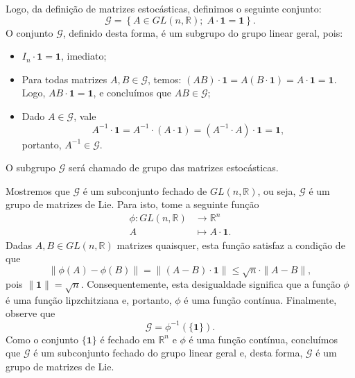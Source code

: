 \documentclass[twoside,openright,titlepage,numbers=noenddot,headinclude,  lineheaders footinclude=true,cleardoublepage=empty,
                                BCOR=5mm,paper=a4,fontsize=12pt ]{scrbook}
\theoremstyle{definition}
\begin{document}
Logo, da definição de matrizes estocásticas, definimos o seguinte conjunto:
\[ \mathcal{G} = \left\{ A \in GL(n, \mathbb{R}); \; A \cdot \mathbf{1} = \mathbf{1} \right\}. \]
O conjunto $\mathcal{G}$, definido desta forma, é um subgrupo do grupo linear geral, pois:
\begin{itemize}
	\item $I_n \cdot \mathbf{1} = \mathbf{1}$, imediato;
	\item Para todas matrizes $A, B \in \mathcal{G}$, temos:
		$(AB)\cdot \mathbf{1} = A(B \cdot\mathbf{1}) = A \cdot \mathbf{1} = \mathbf{1}.$ Logo, $AB \cdot \mathbf{1} = \mathbf{1}$,
        e concluímos que $AB \in \mathcal{G}$;
	\item Dado $A \in \mathcal{G}$, vale
		\[ A^{-1} \cdot \mathbf{1} = A^{-1} \cdot (A \cdot \mathbf{1}) = (A^{-1} \cdot A) \cdot \mathbf{1} = \mathbf{1}, \]
		portanto, $A^{-1} \in \mathcal{G}$.
\end{itemize}
O subgrupo $\mathcal{G}$ será chamado de grupo das matrizes estocásticas.

Mostremos que $\mathcal{G}$ é um subconjunto fechado de $GL(n, \mathbb{R})$, ou seja, $\mathcal{G}$ é um grupo de matrizes de Lie. 
Para isto, tome a seguinte função
\begin{align*}
 \phi : GL(n, \mathbb{R}) &\rightarrow \mathbb{R}^n\\
	A & \mapsto A \cdot \mathbf{1}.
\end{align*}
Dadas $A, B \in GL(n, \mathbb{R} )$ matrizes quaisquer, esta função satisfaz a condição de que  
\[ \| \phi(A) - \phi(B) \| = \| (A - B) \cdot \mathbf{1} \| \leq \sqrt{n} \cdot \| A - B \|, \]
pois $\|\mathbf{1}\| = \sqrt{n}$. Consequentemente,
esta desigualdade significa que a função $\phi$ é uma função lipzchitziana e, portanto, $\phi$ é uma função contínua. 
Finalmente, observe que
\[ \mathcal{G} =  \phi^{-1}( \{ \mathbf{1} \} ). \]
Como o conjunto $\{ \mathbf{1} \}$ é fechado em $\mathbb{R}^n$ e $\phi$ é uma função contínua, 
concluímos que $\mathcal{G}$ é um subconjunto fechado do grupo
linear geral e, desta forma, $\mathcal{G}$ é um grupo de matrizes de Lie.
\end{document}
